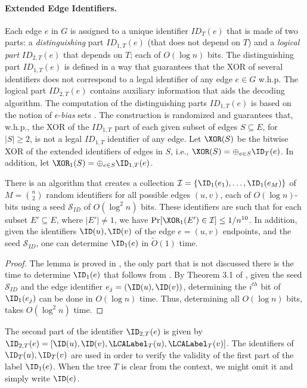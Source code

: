 \paragraph{Extended Edge Identifiers.} Each edge $e$ in $G$ is assigned to a unique identifier $ID_T(e)$ that is made of two parts: a \emph{distinguishing} part $ID_{1,T}(e)$ (that does not depend on $T$) and a \emph{logical part} $ID_{2,T}(e)$ that depends on $T$; each of $O(\log n)$ bits. The distinguishing part $ID_{1,T}(e)$ is defined in a way that guarantees that the XOR of several identifiers does not correspond to a legal identifier of any edge $e \in G$ w.h.p. The logical part $ID_{2,T}(e)$ contains auxiliary information that aids the decoding algorithm. 
The computation of the distinguishing parts $ID_{1,T}(e)$ is based on the notion of $\epsilon$-\emph{bias} sets \cite{naor1993small}. The construction is randomized and guarantees that, w.h.p., the XOR of the $ID_{1,T}$ part of each given subset of edges $S \subseteq E$, for $|S|\geq 2$, is not a legal $ID_{1,T}$ identifier of any edge.
Let $\XOR(S)$ be the bitwise XOR of the extended identifiers of edges in $S$, i.e., $\XOR(S)=\oplus_{e \in S} \ID_T(e)$. In addition, let $\XOR_1(S)=\oplus_{e \in S} \ID_{1,T}(e)$.

\begin{lemma}
\label{cl:epsbias}
There is an algorithm that creates a collection $\mathcal{I}=\{\ID_1(e_1), \ldots, \ID_1(e_{M})\}$ of $M=\binom{n}{2}$ random identifiers for all possible edges $(u,v)$, each of $O(\log n)$-bits using a seed $\mathcal{S}_{ID}$ of $O(\log^2 n)$ bits. These identifiers are such that for each subset $E' \subseteq E$, where $|E'|\neq 1$, we have $\Pr[\XOR_1(E') \in \mathcal{I}] \leq 1/n^{10}$. In addition, given the identifiers $\ID(u), \ID(v)$ of the edge $e=(u,v)$ endpoints, and the seed $\mathcal{S}_{ID}$, one can determine $\ID_1(e)$ in $\widetilde{O}(1)$ time.
\end{lemma}
\begin{proof}
The lemma is proved in \cite{GhaffariP16}, the only part that is not discussed there is the time to determine $\ID_1(e)$ that follows from \cite{naor1993small}. 
By Theorem 3.1 of \cite{naor1993small}, given the seed $\mathcal{S}_{ID}$ and the edge identifier $e_j=(\ID(u), \ID(v))$, determining the $i^{th}$ bit of $\ID_1(e_{j})$ can be done in $O(\log n)$ time. Thus, determining all $O(\log n)$ bits, takes $O(\log^2 n)$ time. 
\end{proof}
The second part of the identifier $\ID_{2,T}(e)$ is given by $\ID_{2,T}(e)=[\ID(u), \ID(v), \LCALabel_T(u), \LCALabel_T(v)]$. 
The identifiers of $\ID_T(u), \ID_T(v)$ are used in order to verify the validity of the first part of the label $\ID_1(e)$. When the tree $T$ is clear from the context, we might omit it and simply write $\ID(e)$. 

